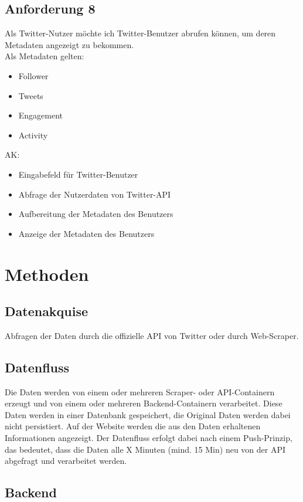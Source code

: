 \documentclass[conference]{IEEEtran}
\begin{document}
\subsection{Anforderung 8}
Als Twitter-Nutzer möchte ich Twitter-Benutzer abrufen können,
um deren Metadaten angezeigt zu bekommen.
\\
Als Metadaten gelten:
\begin{itemize}
        \item Follower
        \item Tweets
        \item Engagement
        \item Activity
\end{itemize}
AK:
\begin{itemize}
        \item Eingabefeld für Twitter-Benutzer
        \item Abfrage der Nutzerdaten von Twitter-API
        \item Aufbereitung der Metadaten des Benutzers
        \item Anzeige der Metadaten des Benutzers
\end{itemize}


\section{Methoden}

\subsection*{Datenakquise}

Abfragen der Daten durch die offizielle API von Twitter oder durch Web-Scraper.

\subsection*{Datenfluss}
Die Daten werden von einem oder mehreren Scraper- oder API-Containern erzeugt und von einem oder mehreren Backend-Containern verarbeitet.
Diese Daten werden in einer Datenbank gespeichert, die Original Daten werden dabei nicht persistiert.
Auf der Website werden die aus den Daten erhaltenen Informationen angezeigt.
Der Datenfluss erfolgt dabei nach einem Push-Prinzip, das bedeutet, dass die Daten alle X Minuten (mind. 15 Min) neu von der API abgefragt und verarbeitet werden.

\subsection*{Backend}
\end{document}
